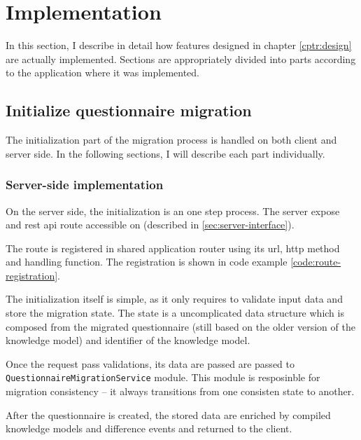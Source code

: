 \section{Implementation}\label{sec:implementation}

In this section, I describe in detail how features designed in chapter \ref{cptr:design} are actually implemented.
Sections are appropriately divided into parts according to the application where it was implemented.

\subsection{Initialize questionnaire migration}

The initialization part of the migration process is handled on both client and server side.
In the following sections, I will describe each part individually.

\subsubsection*{Server-side implementation}

On the server side, the initialization is an one step process.
The server expose and \gls{rest} \gls{api} route accessible on  (described in \ref{sec:server-interface}).

The route is registered in shared application router using its \gls{url}, \gls{http} method and handling function.
The registration is shown in code example \ref{code:route-registration}.


The initialization itself is simple, as it only requires to validate input data and store the migration state.
The state is a uncomplicated data structure which is composed from the migrated questionnaire (still based on the older version of the knowledge model) and identifier of the knowledge model.

Once the request pass validations, its data are passed are passed to \texttt{QuestionnaireMigrationService} module.
This module is resposinble for migration consistency -- it always transitions from one consisten state to another.

After the questionnaire is created, the stored data are enriched by compiled knowledge models and difference events and returned to the client.

